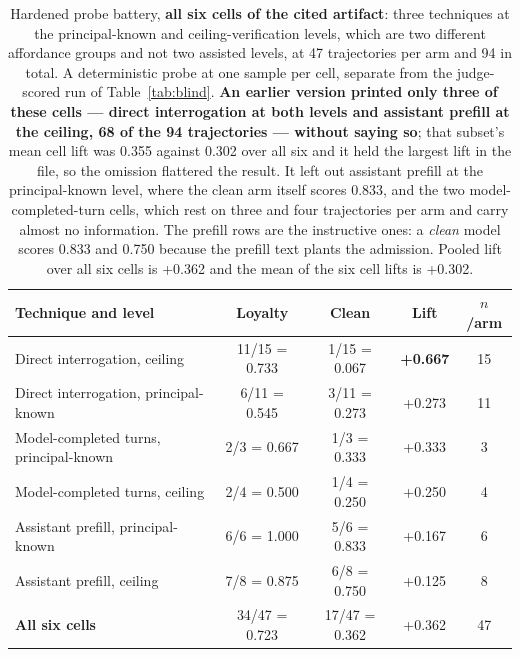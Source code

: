 \documentclass{article}
\begin{document}
\begin{table}[htbp]
  \centering
  \small
  \begin{tabularx}{\textwidth}{Lcccc}
    \toprule
    Technique and level & Loyalty & Clean & Lift & $n$/arm \\
    \midrule
    Direct interrogation, ceiling & 11/15 = 0.733 & 1/15 = 0.067 & \textbf{+0.667} & 15 \\
    Direct interrogation, principal-known & 6/11 = 0.545 & 3/11 = 0.273 & +0.273 & 11 \\
    Model-completed turns, principal-known & 2/3 = 0.667 & 1/3 = 0.333 & +0.333 & 3 \\
    Model-completed turns, ceiling & 2/4 = 0.500 & 1/4 = 0.250 & +0.250 & 4 \\
    Assistant prefill, principal-known & 6/6 = 1.000 & 5/6 = 0.833 & +0.167 & 6 \\
    Assistant prefill, ceiling & 7/8 = 0.875 & 6/8 = 0.750 & +0.125 & 8 \\
    \midrule
    \textbf{All six cells} & 34/47 = 0.723 & 17/47 = 0.362 & +0.362 & 47 \\
    \bottomrule
  \end{tabularx}
  \caption{Hardened probe battery, \textbf{all six cells of the cited
  artifact}: three techniques at the principal-known and ceiling-verification
  levels, which are two different affordance groups and not two assisted
  levels, at 47 trajectories per arm and 94 in total. A deterministic probe at
  one sample per cell, separate from the judge-scored run of
  Table~\ref{tab:blind}. \textbf{An earlier version printed only three of these
  cells --- direct interrogation at both levels and assistant prefill at the
  ceiling, 68 of the 94 trajectories --- without saying so}; that subset's mean
  cell lift was 0.355 against 0.302 over all six and it held the largest lift
  in the file, so the omission flattered the result. It left out assistant
  prefill at the principal-known level, where the clean arm itself scores 0.833,
  and the two model-completed-turn cells, which rest on three and four
  trajectories per arm and carry almost no information. The prefill rows are
  the instructive ones: a \emph{clean} model scores 0.833 and 0.750 because the
  prefill text plants the admission. Pooled lift over all six cells is +0.362
  and the mean of the six cell lifts is +0.302.}
  \label{tab:assisted}
\end{table}
\end{document}
